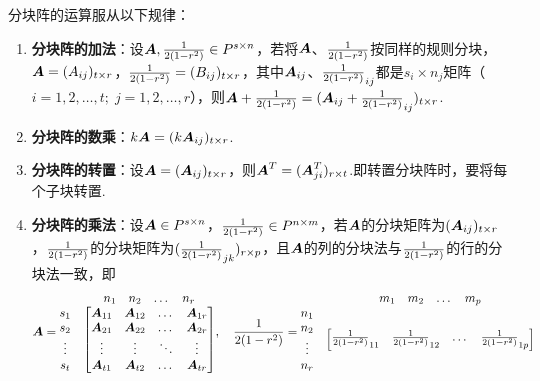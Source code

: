 \begin{theorem}
分块阵的运算服从以下规律：
\begin{enumerate}
\item \textbf{分块阵的加法}：设\(\boldsymbol{A},\frac{1}{2(1-r^2)} \in P^{s \times n}\)，若将\(\boldsymbol{A}\)、\(\frac{1}{2(1-r^2)}\)按同样的规则分块，\(\boldsymbol{A}=(A_{ij})_{t \times r}\)，\(\frac{1}{2(1-r^2)}=(B_{ij})_{t \times r}\)，其中\(\boldsymbol{A}_{ij}\)、\(\frac{1}{2(1-r^2)}_{ij}\)都是\(s_i \times n_j\)矩阵（\(i=1,2,\dotsc,t;\;j=1,2,\dotsc,r\)），则\(\boldsymbol{A}+\frac{1}{2(1-r^2)}=(\boldsymbol{A}_{ij}+\frac{1}{2(1-r^2)}_{ij})_{t \times r}\).
\item \textbf{分块阵的数乘}：\(k\boldsymbol{A}=(k\boldsymbol{A}_{ij})_{t \times r}\).
\item \textbf{分块阵的转置}：设\(\boldsymbol{A}=(\boldsymbol{A}_{ij})_{t \times r}\)，则\(\boldsymbol{A}^T=(\boldsymbol{A}_{ji}^T)_{r \times t}\).即转置分块阵时，要将每个子块转置.
\item \textbf{分块阵的乘法}：设\(\boldsymbol{A} \in P^{s \times n}\)，\(\frac{1}{2(1-r^2)} \in P^{n \times m}\)，若\(\boldsymbol{A}\)的分块矩阵为\((\boldsymbol{A}_{ij})_{t \times r}\)，\(\frac{1}{2(1-r^2)}\)的分块矩阵为\((\frac{1}{2(1-r^2)}_{jk})_{r \times p}\)，且\(\boldsymbol{A}\)的列的分块法与\(\frac{1}{2(1-r^2)}\)的行的分块法一致，即
\begin{align*}
\boldsymbol{A} = \begin{matrix}
& \begin{matrix} n_1 & n_2 & \dots & n_r \end{matrix} \\
\begin{matrix} s_1 \\ s_2 \\ \vdots \\ s_t \end{matrix} & \begin{bmatrix}
\boldsymbol{A}_{11} & \boldsymbol{A}_{12} & \dots & \boldsymbol{A}_{1r} \\
\boldsymbol{A}_{21} & \boldsymbol{A}_{22} & \dots & \boldsymbol{A}_{2r} \\
\vdots & \vdots & \ddots & \vdots \\
\boldsymbol{A}_{t1} & \boldsymbol{A}_{t2} & \dots & \boldsymbol{A}_{tr}
\end{bmatrix}
\end{matrix}
,\quad
\frac{1}{2(1-r^2)} = \begin{matrix}
& \begin{matrix} m_1 & m_2 & \dots & m_p \end{matrix} \\
\begin{matrix} n_1 \\ n_2 \\ \vdots \\ n_r \end{matrix} & \begin{bmatrix}
\frac{1}{2(1-r^2)}_{11} & \frac{1}{2(1-r^2)}_{12} & \dots & \frac{1}{2(1-r^2)}_{1p} \\

\end{bmatrix}
\end{matrix}
\end{align*}
\end{enumerate}
\end{theorem}
